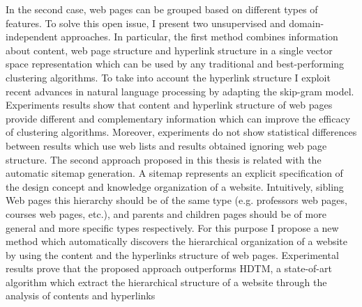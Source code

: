 In the second case, web pages can be grouped based on different types of features. To solve this open issue, I present two unsupervised and domain-independent approaches. In particular, the first method combines information about content, web page structure and hyperlink structure in a single vector space representation which can be used by any traditional and best-performing clustering algorithms. To take into account the hyperlink structure I exploit recent advances in natural language processing by adapting the skip-gram model. %
Experiments results show that content and hyperlink structure of web pages provide  different  and  complementary  information which can improve the efficacy of clustering algorithms. Moreover, experiments do not show statistical differences between results which use web lists and results obtained ignoring web page structure. 
The second approach proposed in this thesis is related with the automatic sitemap generation. A sitemap represents an explicit specification of the design concept and knowledge organization of a website. Intuitively, sibling Web pages this hierarchy should be of the same type (e.g. professors web pages, courses web pages, etc.), and parents and children pages should be of more general and more specific types respectively. For this purpose I propose a new method which automatically discovers the hierarchical organization of a website by using the content and the hyperlinks structure of web pages. Experimental results prove that the proposed approach outperforms HDTM, a state-of-art algorithm which extract the hierarchical structure of a website through the analysis of contents and hyperlinks 
